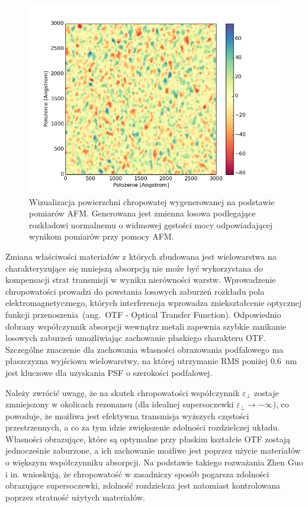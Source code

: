 \begin{figure}[bt]
		\includegraphics[width=\textwidth]{images/multilayer/ag30nm-afm-generated.png}
		\caption{Wizualizacja powierzchni chropowatej wygenerowanej na podstawie pomiarów AFM. Generowana jest zmienna losowa podlegające rozkładowi normalnemu o widmowej gęstości mocy odpowiadającej wynikom pomiarów przy pomocy AFM.} 
		\label{fig:ag30nm-afmgene}
\end{figure}


Zmiana właściwości materiałów z których zbudowana jest wielowarstwa na charakteryzujące się mniejszą absorpcją nie może być wykorzystana do kompensacji strat transmisji w wyniku nierówności warstw. Wprowadzenie chropowatości prowadzi do powstania losowych zaburzeń rozkładu pola elektromagnetycznego, których interferencja wprowadza zniekształcenie optycznej funkcji przenoszenia~(ang.~OTF - Optical Transfer Function). Odpowiednio dobrany współczynnik absorpcji wewnątrz metali zapewnia szybkie zanikanie losowych zaburzeń umożliwiając zachowanie płaskiego charakteru OTF. Szczególne znaczenie dla zachowania własności obrazowania podfalowego ma płaszczyzna wyjściowa wielowarstwy, na której utrzymanie RMS poniżej $0.6$~nm jest kluczowe dla uzyskania PSF o szerokości podfalowej. \cite{guo2014negative}

Należy zwrócić uwagę, że na skutek chropowatości współczynnik $\varepsilon_{\perp}$ zostaje zmniejszony w okolicach rezonansu (dla idealnej supersoczewki $\varepsilon_{\perp} \to - \infty$), co powoduje, że możliwa jest efektywna transmisja wyższych częstości przestrzennych, a co za tym idzie zwiększenie zdolności rozdzielczej układu. Własności obrazujące, które są optymalne przy płaskim kształcie OTF zostają jednocześnie zaburzone, a ich zachowanie możliwe jest poprzez użycie materiałów o większym współczynniku absorpcji. Na podstawie takiego rozważania Zhen Guo i in.\cite{guo2014negative} wnioskują, że chropowatość w zasadniczy sposób pogarsza zdolności obrazujące supersoczewki, zdolność rozdzielcza jest natomiast kontrolowana poprzez stratność użytych materiałów.


